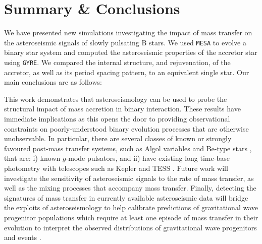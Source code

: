 \documentclass[twocolumn, twocolappendix, oneside]{aastex631}
\makeatletter
\newcommand{\unit}[1]{%
    \,\mathrm{#1}\checknextarg}
\newcommand{\checknextarg}{\@ifnextchar\bgroup{\gobblenextarg}{}}
\newcommand{\gobblenextarg}[1]{\,\mathrm{#1}\@ifnextchar\bgroup{\gobblenextarg}{}}
\newcommand{\gmode}{$g$-mode\xspace}
\newcommand{\mesa}{\texttt{MESA}\xspace}
\newcommand{\gyre}{\texttt{GYRE}\xspace}
\newif\ifstartedinmathmode
\newcommand{\msun}{%
  \relax\ifmmode\startedinmathmodetrue\else\startedinmathmodefalse\fi
  {\ifstartedinmathmode\unit{M_{\odot}}\else$\unit{M_{\odot}}$\fi}\xspace%
}
\newif\ifstartedinmathmode
\makeatother
\begin{document}
\section{Summary \& Conclusions} \label{sec:conclusion}

We have presented new simulations investigating the impact of mass transfer on the asteroseismic signals of slowly pulsating B stars. We used \mesa to evolve a binary star system and computed the asteroseismic properties of the accretor star using \gyre. We compared the internal structure, and rejuvenation, of the accretor, as well as its period spacing pattern, to an equivalent single star. Our main conclusions are as follows:


This work demonstrates that asteroseismology can be used to probe the structural impact of mass accretion in binary interaction. These results have immediate implications as this opens the door to providing observational constraints on poorly-understood binary evolution processes that are otherwise unobservable. In particular, there are several classes of known or strongly favoured post-mass transfer systems, such as Algol variables and Be-type stars \citep[e.g.][]{Bodensteiner+2020}, that are: i) known \gmode pulsators, and ii) have existing long time-base photometry with telescopes such as Kepler \citep{Borucki+2010} and TESS \citep{Ricker+2015}. Future work will investigate the sensitivity of asteroseismic signals to the rate of mass transfer, as well as the mixing processes that accompany mass transfer. Finally, detecting the signatures of mass transfer in currently available asteroseismic data will bridge the exploits of asteroseismology to help calibrate predictions of gravitational wave progenitor populations which require at least one episode of mass transfer in their evolution to interpret the observed distributions of gravitational wave progenitors and events \citep{Abbott+2023}.  
\end{document}
